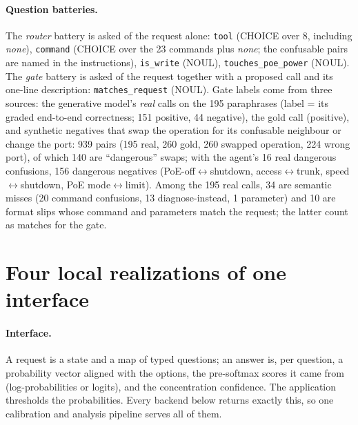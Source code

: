 \documentclass[11pt]{article}
\begin{document}
\paragraph{Question batteries.} The \emph{router} battery is asked of the request alone:
\texttt{tool} (CHOICE over 8, including \emph{none}), \texttt{command} (CHOICE over the 23
commands plus \emph{none}; the confusable pairs are named in the instructions),
\texttt{is\_write} (NOUL), \texttt{touches\_poe\_power} (NOUL). The \emph{gate} battery is asked
of the request together with a proposed call and its one-line description:
\texttt{matches\_request} (NOUL). Gate labels come from three sources: the generative model's
\emph{real} calls on the 195 paraphrases (label = its graded end-to-end correctness; 151
positive, 44 negative), the gold call (positive), and synthetic negatives that swap the
operation for its confusable neighbour or change the port: 939 pairs (195 real, 260 gold, 260
swapped operation, 224 wrong port), of which 140 are ``dangerous'' swaps; with the agent's 16 real dangerous confusions, 156 dangerous negatives
(PoE-off$\leftrightarrow$shutdown, access$\leftrightarrow$trunk, speed$\leftrightarrow$shutdown,
PoE mode$\leftrightarrow$limit). Among the 195 real calls, 34 are semantic misses (20 command
confusions, 13 diagnose-instead, 1 parameter) and 10 are format slips whose command and
parameters match the request; the latter count as matches for the gate.

\section{Four local realizations of one interface}
\label{sec:backends}

\paragraph{Interface.} A request is a state and a map of typed questions; an answer is, per
question, a probability vector aligned with the options, the pre-softmax scores it came from
(log-probabilities or logits), and the concentration confidence. The application thresholds
the probabilities. Every backend below returns exactly this, so one calibration and analysis
pipeline serves all of them.
\end{document}
